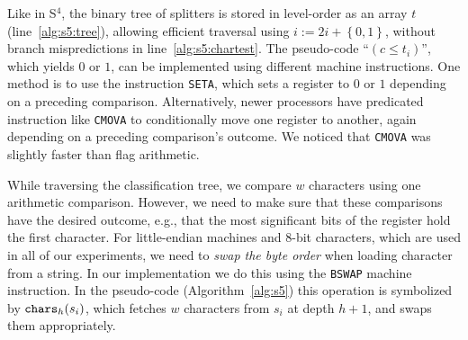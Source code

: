 \documentclass[a4paper]{myjournal}
\newcommand{\set}[1]{\left\{ #1\right\}}
\begin{document}
Like in S$^4$, the binary tree of splitters is stored in level-order as an array
$t$ (line~\ref{alg:s5:tree}), allowing efficient traversal using $i := 2 i +
\set{0,1}$, without branch mispredictions in line~\ref{alg:s5:chartest}. The
pseudo-code ``$(c \leq t_i)$'', which yields $0$ or $1$, can be implemented
using different machine instructions. One method is to use the instruction
\texttt{SETA}, which sets a register to $0$ or $1$ depending on a preceding
comparison. Alternatively, newer processors have predicated instruction like
\texttt{CMOVA} to conditionally move one register to another, again depending on
a preceding comparison's outcome. We noticed that \texttt{CMOVA} was slightly
faster than flag arithmetic.

While traversing the classification tree, we compare $w$ characters using one
arithmetic comparison. However, we need to make sure that these comparisons
have the desired outcome, e.g., that the most significant bits of the register
hold the first character. For little-endian machines and 8-bit characters, which
are used in all of our experiments, we need to \emph{swap the byte order} when
loading character from a string. In our implementation we do this using the
\texttt{BSWAP} machine instruction. In the pseudo-code (Algorithm~\ref{alg:s5})
this operation is symbolized by $\FuncSty{chars}_h(s_i)$, which fetches $w$
characters from $s_i$ at depth $h+1$, and swaps them appropriately.
\end{document}
